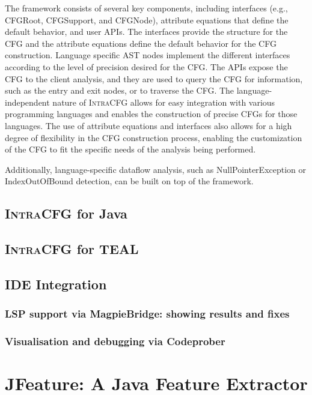 The framework consists of several key components, including interfaces
(e.g., CFGRoot, CFGSupport, and CFGNode), attribute equations that define the
default behavior, and user APIs. The interfaces provide the structure for the
CFG and the attribute equations define the default behavior for the CFG
construction. Language specific AST nodes implement the different interfaces 
according to the level of precision desired for the CFG.
The APIs expose the CFG to the client analysis, and they are used to query the CFG
for information, such as the entry and exit nodes, or to traverse the CFG.
The language-independent nature of \textsc{IntraCFG} allows for easy integration 
with various programming languages and enables the construction of precise CFGs 
for those languages. The use of attribute equations and interfaces also allows 
for a high degree of flexibility in the CFG construction process, 
enabling the customization of the CFG to fit the specific needs of the 
analysis being performed.

Additionally, language-specific dataflow analysis, such as NullPointerException or
IndexOutOfBound detection, can be built on top of the framework.

\subsection{\textsc{IntraCFG} for Java}

\subsection{\textsc{IntraCFG} for TEAL}

\subsection{IDE Integration}
\subsubsection{LSP support via MagpieBridge: showing results and fixes}

\subsubsection{Visualisation and debugging via Codeprober}



\section{JFeature: A Java Feature Extractor}







